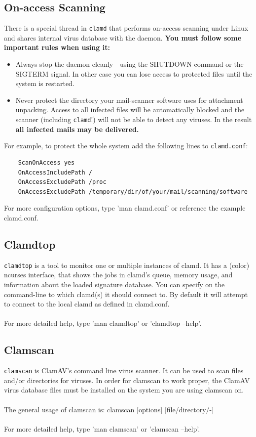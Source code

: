 \documentclass[a4paper,titlepage,12pt]{article}
\begin{document}
    \subsection{On-access Scanning}\label{On-access}
    There is a special thread in \verb+clamd+ that performs on-access
    scanning under Linux and shares internal virus database
    with the daemon. \textbf{You must follow some important rules when
    using it:}
    \begin{itemize}
	\item Always stop the daemon cleanly - using the SHUTDOWN command or
	      the\\ SIGTERM signal. In other case you can lose access
	      to protected files until the system is restarted.
	\item Never protect the directory your mail-scanner software
	      uses for attachment unpacking. Access to all infected
	      files will be automatically blocked and the scanner (including
	      \verb+clamd+!) will not be able to detect any viruses. In the
	      result \textbf{all infected mails may be delivered.}
    \end{itemize}
    For example, to protect the whole system add the following lines to
    \verb+clamd.conf+:
    \begin{verbatim}
	ScanOnAccess yes
	OnAccessIncludePath /
	OnAccessExcludePath /proc
	OnAccessExcludePath /temporary/dir/of/your/mail/scanning/software
    \end{verbatim}
    For more configuration options, type 'man clamd.conf' or reference the
    example clamd.conf.

    \subsection{Clamdtop}
    \verb+clamdtop+ is a tool to monitor one or multiple instances of clamd.  It
    has a (color) ncurses interface, that shows the jobs in clamd's queue,
    memory usage, and information about the loaded signature database.
    You can specify on the command-line to which clamd(s) it should connect
    to. By default it will attempt to connect to the local clamd as defined
    in clamd.conf.
    \\\\
    For more detailed help, type 'man clamdtop' or 'clamdtop --help'.

    \subsection{Clamscan}
    \verb+clamscan+ is ClamAV's command line virus scanner.  It can be used to
    scan files and/or directories for viruses.  In order for clamscan
    to work proper, the ClamAV virus database files must be installed on
    the system you are using clamscan on.
    \\\\
    The general usage of clamscan is: clamscan [options] [file/directory/-]
    \\\\
    For more detailed help, type 'man clamscan' or 'clamscan --help'.
\end{document}
